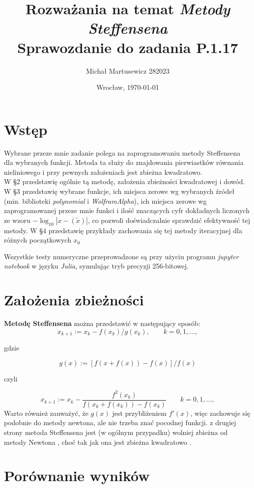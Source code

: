 \documentclass{article}
\author{Michał Martusewicz 282023}
\date{Wrocław, \today}
\title{\textbf{Rozważania na temat \textit{Metody Steffensena}}  \\ Sprawozdanie do zadania P.1.17}
\begin{document}
\maketitle
\section{Wstęp}

Wybrane przeze mnie zadanie polega na zaprogramowaniu metody Steffensena dla wybranych funkcji.
Metoda ta służy do znajdowania pierwiastków równania nieliniowego i przy pewnych założeniach jest zbieżna kwadratowo.
\\ \indent
 W \S 2 przedstawię ogólnie tą metodę, założenia zbieżności kwadratowej i dowód.
 \\ \indent
 W \S 3 przedstawię wybrane funkcje, ich miejsca zerowe wg wybranych źródeł (min. biblioteki \textit{polynomial} i \textit{WolframAlpha}), ich miejsca zerowe wg zaprogramowanej przeze mnie funkci i ilość znaczących cyfr dokładnych liczonych ze wzoru $-\log_{10}{|x-(\widetilde x)|}$, co pozwoli doświadczalnie sprawdzić efektywność tej metody.
W \S 4 przedstawię przykłady zachowania się tej metody iteracyjnej dla różnych początkowych $x_0$
 
Wszystkie testy numeryczne przeprowadzone są przy użyciu programu \textit{jupyter notebook} w języku \textit{Julia}, symulując tryb precyzji 256-bitowej.

\section{Założenia zbieżności}
\textbf{Metodę Steffensena} można przedstawić w następujący sposób:
$$
x_{k+1}:= x_k - f(x_k)/g(x_k),  \qquad k=0,1,...,
$$

gdzie


$$
g(x):=[f(x+f(x))-f(x)]/f(x)
$$

czyli


$$
x_{k+1}:=x_k-\frac{f^2(x_k)}{f(x_k+f(x_k))-f(x_k)} \qquad k=0,1,...,
$$
Warto również zauważyć, że $g(x)$ jest przybliżeniem $f'(x)$, więc zachowuje się podobnie do metody newtona, ale nie trzeba znać pocodnej funkcji. z drugiej strony metoda Steffensena jest (w ogólnym przypadku) wolniej zbieżna od metody Newtona \cite{bib1}, choć tak jak ona jest zbieżna kwadratowo \cite{bib5} . 

\section{Porównanie wyników}
\end{document}
